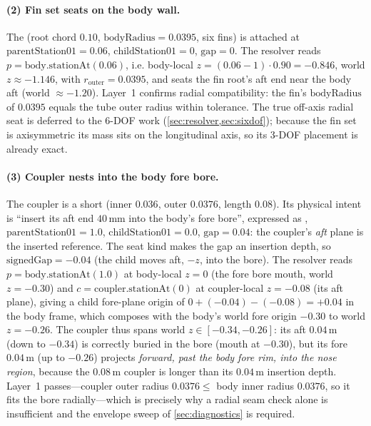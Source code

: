 \paragraph{(2) Fin set seats on the body wall.}
The  (root chord $0.10$, $\text{bodyRadius}=0.0395$, six fins) is attached
 at $\text{parentStation01}=0.06$, $\text{childStation01}=0$,
$\text{gap}=0$. The resolver reads $p = \text{body}.\text{stationAt}(0.06)$, i.e. body-local
$z = (0.06-1)\cdot 0.90 = -0.846$, world $z \approx -1.146$, with $r_{\text{outer}}=0.0395$, and
seats the fin root's aft end near the body aft (world $\approx -1.20$). Layer~1 confirms radial compatibility: the fin's $\text{bodyRadius}$
of $0.0395$ equals the tube outer radius within tolerance. The true off-axis radial seat
is deferred to the 6-DOF work (\cref{sec:resolver,sec:sixdof}); because the fin set is
axisymmetric its mass sits on the longitudinal axis, so its 3-DOF placement is already exact.

\paragraph{(3) Coupler nests into the body fore bore.}
The coupler is a short  (inner $0.036$, outer $0.0376$, length $0.08$). Its
physical intent is ``insert its aft end $40\,$mm into the body's fore bore'', expressed as
, $\text{parentStation01}=1.0$, $\text{childStation01}=0.0$,
$\text{gap}=0.04$: the coupler's \emph{aft} plane is the inserted reference. The seat kind makes
the gap an insertion depth, so $\text{signedGap} = -0.04$ (the child moves aft, $-z$, into the
bore). The resolver reads $p = \text{body}.\text{stationAt}(1.0)$ at body-local $z = 0$ (the
fore bore mouth, world $z=-0.30$) and $c = \text{coupler}.\text{stationAt}(0)$ at coupler-local
$z = -0.08$ (its aft plane), giving a child fore-plane origin of $0 + (-0.04) - (-0.08) = +0.04$ in
the body frame, which composes with the body's world fore origin $-0.30$ to world $z = -0.26$. The
coupler thus spans world $z \in [-0.34, -0.26]$: its aft $0.04\,$m (down to $-0.34$) is correctly
buried in the bore (mouth at $-0.30$), but its fore $0.04\,$m (up to $-0.26$) projects \emph{forward,
past the body fore rim, into the nose region}, because the $0.08\,$m coupler is longer than its
$0.04\,$m insertion depth. Layer~1 passes---coupler outer radius $0.0376 \le$ body inner radius
$0.0376$, so it fits the bore radially---which is precisely why a radial seam check alone is
insufficient and the envelope sweep of \cref{sec:diagnostics} is required.


